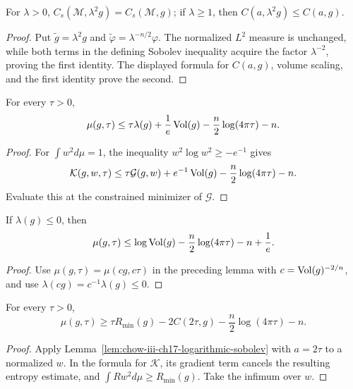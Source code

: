 \begin{lemma}
\label{lem:chow-iii-ch17-sobolev-scaling}
For $\lambda>0$,
$C_s(\mathcal M,\lambda^2g)=C_s(\mathcal M,g)$; if $\lambda\ge1$, then
$C(a,\lambda^2g)\le C(a,g)$.
\end{lemma}
\begin{proof}
Put $\widetilde g=\lambda^2g$ and
$\widetilde\varphi=\lambda^{-n/2}\varphi$.  The normalized $L^2$ measure is
unchanged, while both terms in the defining Sobolev inequality acquire the
factor $\lambda^{-2}$, proving the first identity.  The displayed formula
for $C(a,g)$, volume scaling, and the first identity prove the second.
\end{proof}

\begin{lemma}
\label{lem:chow-iii-ch17-mu-upper-lambda-volume}
For every $\tau>0$,
\[
 \mu(g,\tau)\le\tau\lambda(g)+\frac1e\operatorname{Vol}(g)
 -\frac n2\log(4\pi\tau)-n.
\]
\end{lemma}
\begin{proof}
For $\int w^2d\mu=1$, the inequality
$w^2\log w^2\ge-e^{-1}$ gives
\[
 \mathcal K(g,w,\tau)\le \tau\mathcal G(g,w)+e^{-1}\Vol(g)
 -\frac n2\log(4\pi\tau)-n.
\]
Evaluate this at the constrained minimizer of $\mathcal G$.
\end{proof}

\begin{corollary}
\label{cor:chow-iii-ch17-mu-upper-nonpositive-lambda}
If $\lambda(g)\le0$, then
\[
 \mu(g,\tau)\le\log\operatorname{Vol}(g)-\frac n2\log(4\pi\tau)-n+\frac1e.
\]
\end{corollary}
\begin{proof}
Use $\mu(g,\tau)=\mu(cg,c\tau)$ in the preceding lemma with
$c=\operatorname{Vol}(g)^{-2/n}$, and use $\lambda(cg)=c^{-1}\lambda(g)\le0$.
\end{proof}

\begin{lemma}
\label{lem:chow-iii-ch17-mu-lower-log-sobolev}
For every $\tau>0$,
\[
 \mu(g,\tau)\ge \tau R_{\min}(g)-2C(2\tau,g)
 -\frac n2\log(4\pi\tau)-n.
\]
\end{lemma}
\begin{proof}
Apply Lemma~\ref{lem:chow-iii-ch17-logarithmic-sobolev} with $a=2\tau$
to a normalized $w$.  In the formula for $\mathcal K$, its gradient term
cancels the resulting entropy estimate, and
$\int Rw^2d\mu\ge R_{\min}(g)$.  Take the infimum over $w$.
\end{proof}

